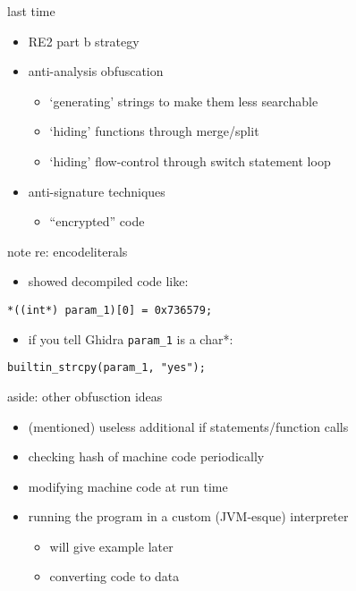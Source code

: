 \date{}
\title{}
\date{}

\begin{frame}
    \titlepage
\end{frame}

\usetikzlibrary{calc} %


\begin{frame}{last time}
    \begin{itemize}
    \item RE2 part b strategy
    \item anti-analysis obfuscation
        \begin{itemize}
        \item `generating' strings to make them less searchable
        \item `hiding' functions through merge/split
        \item `hiding' flow-control through switch statement loop
        \end{itemize}
    \item anti-signature techniques
        \begin{itemize}
        \item ``encrypted'' code
        \end{itemize}
    \end{itemize}
\end{frame}

\begin{frame}[fragile]{note re: encodeliterals}
    \begin{itemize}
    \item showed decompiled code like:
    \end{itemize}
\begin{Verbatim}[fontsize=\small]
*((int*) param_1)[0] = 0x736579;
\end{Verbatim}
    \begin{itemize}
    \item if you tell Ghidra \texttt{param\_1} is a char*:
    \end{itemize}
\begin{Verbatim}[fontsize=\small]
builtin_strcpy(param_1, "yes");
\end{Verbatim}
\end{frame}

\begin{frame}{aside: other obfusction ideas}
    \begin{itemize}
    \item (mentioned) useless additional if statements/function calls
    \item checking hash of machine code periodically
    \item modifying machine code at run time
    \item running the program in a custom (JVM-esque) interpreter
        \begin{itemize}
        \item will give example later
        \item converting code to data
        \end{itemize}
    \end{itemize}
\end{frame}


